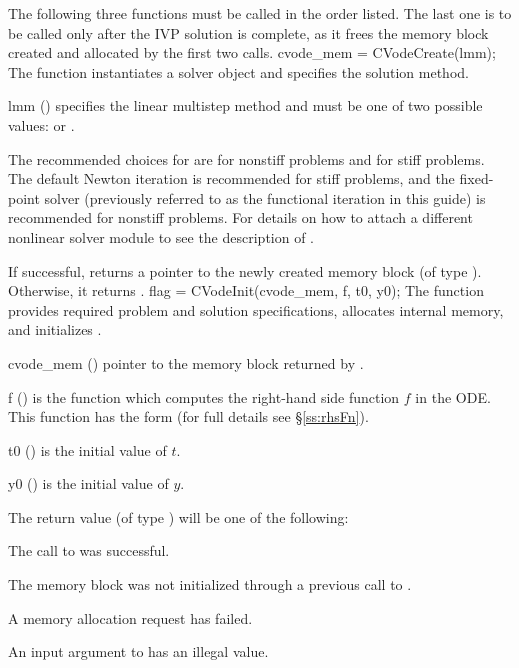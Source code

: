The following three functions must be called in the order listed. The last one
is to be called only after the IVP solution is complete, as it frees the
{\cvode} memory block created and allocated by the first two calls.
{
  cvode\_mem = CVodeCreate(lmm);
}
{
  The function  instantiates a {\cvode} solver object and
  specifies the solution method.
}
{
  \begin{args}[lmm]
  \item[lmm] ()
    specifies the linear multistep method and must be one of two
    possible values:  or .
  \end{args}
  The recommended choices for  are  for nonstiff problems
  and  for stiff problems. The default Newton iteration is
  recommended for stiff problems, and the fixed-point solver (previously referred
  to as the functional iteration in this guide) is
  recommended for nonstiff problems. For details on how to attach a
  different nonlinear solver module to {\cvode} see the description of
  .
}
{
  If successful,  returns a pointer to the newly created
  {\cvode} memory block (of type ).  Otherwise, it returns .
}
{}
{
flag = CVodeInit(cvode\_mem, f, t0, y0);
}
{
  The function  provides required problem and solution
  specifications, allocates internal memory, and initializes {\cvode}.
}
{
  \begin{args}
  \item[cvode\_mem] ()
    pointer to the {\cvode} memory block returned by .
  \item[f] ()
    is the {\CC} function which computes the right-hand side function $f$ in the ODE.
    This function has the form  (for full details see
    \S\ref{ss:rhsFn}).
  \item[t0] ()
    is the initial value of $t$.
  \item[y0] ()
    is the initial value of $y$.
  \end{args}
}
{
  The return value  (of type ) will be one of the following:
  \begin{args}
  \item[\Id{CV\_SUCCESS}]
    The call to  was successful.
  \item[\Id{CV\_MEM\_NULL}]
    The {\cvode} memory block was not initialized through a previous call
    to .
  \item[\Id{CV\_MEM\_FAIL}]
    A memory allocation request has failed.
  \item[\Id{CV\_ILL\_INPUT}]
    An input argument to  has an illegal value.
  \end{args}
}
